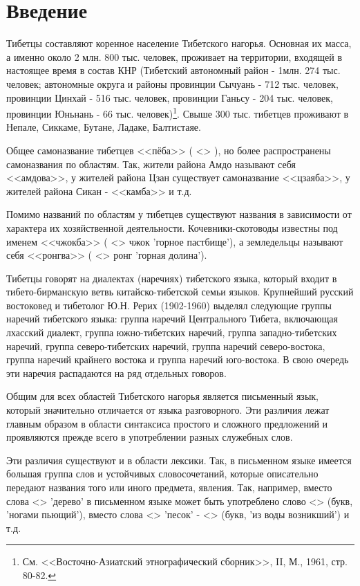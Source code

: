 \chapter{Введение}

Тибетцы составляют коренное население Тибетского нагорья. Основная их масса, а именно около 2 млн. 800 тыс. человек, проживает на территории, входящей в настоящее время в состав КНР (Тибетский автономный район - 1млн. 274 тыс. человек; автономные округа и районы провинции Сычуань - 712 тыс. человек, провинции Цинхай - 516 тыс. человек, провинции Ганьсу - 204 тыс. человек, провинции Юньнань - 66 тыс. человек)\footnote[1]{См. <<Восточно-Азиатский этнографический сборник>>, II, М., 1961, стр. 80-82.}. Свыше 300 тыс. тибетцев проживают в Непале, Сиккаме, Бутане, Ладаке, Балтистаяе.

Общее самоназвание тибетцев <<пёба>> ( <> ), но более распространены самоназвания по областям. Так, жители района Амдо называют себя <<амдова>>, у жителей района Цзан существует самоназвание <<цзаяба>>, у жителей района Сикан - <<камба>> и т.д.

Помимо названий по областям у тибетцев существуют названия в зависимости от характера их хозяйственной деятельности. Кочевники-скотоводы известны под именем <<чжокба>> ( <> чжок 'горное пастбище'), а земледельцы называют себя <<ронгва>> ( <> ронг 'горная долина').

Тибетцы говорят на диалектах (наречиях) тибетского языка, который входит в тибето-бирманскую ветвь китайско-тибетской семьи языков. Крупнейший русский востоковед и тибетолог Ю.Н. Рерих (1902-1960) выделял следующие группы наречий тибетского языка: группа наречий Центрального Тибета, включающая лхасский диалект, группа южно-тибетских наречий, группа западно-тибетских наречий, группа северо-тибетских наречий, группа наречий северо-востока, группа наречий крайнего востока и группа наречий юго-востока. В свою очередь эти наречия распадаются на ряд отдельных говоров.

Общим для всех областей Тибетского нагорья является письменный язык, который значительно отличается от языка разговорного. Эти различия лежат главным образом в области синтаксиса простого и сложного предложений и проявляются прежде всего в употреблении разных служебных слов.

Эти различия существуют и в области лексики. Так, в письменном языке имеется большая группа слов и устойчивых словосочетаний, которые описательно передают названия того или иного предмета, явления. Так, например, вместо слова <> 'дерево' в письменном языке может быть употреблено слово <> (букв, 'ногами пьющий'), вместо слова <> 'песок' - <> (букв, 'из воды возникший') и т.д.

